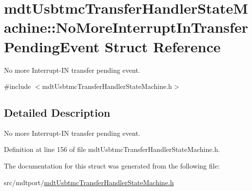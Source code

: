 \hypertarget{structmdt_usbtmc_transfer_handler_state_machine_1_1_no_more_interrupt_in_transfer_pending_event}{\section{mdt\-Usbtmc\-Transfer\-Handler\-State\-Machine\-:\-:No\-More\-Interrupt\-In\-Transfer\-Pending\-Event Struct Reference}
\label{structmdt_usbtmc_transfer_handler_state_machine_1_1_no_more_interrupt_in_transfer_pending_event}
}


No more Interrupt-\/\-I\-N transfer pending event.  




{\ttfamily \#include $<$mdt\-Usbtmc\-Transfer\-Handler\-State\-Machine.\-h$>$}



\subsection{Detailed Description}
No more Interrupt-\/\-I\-N transfer pending event. 

Definition at line 156 of file mdt\-Usbtmc\-Transfer\-Handler\-State\-Machine.\-h.



The documentation for this struct was generated from the following file\-:\begin{DoxyCompactItemize}
\item 
src/mdtport/\hyperlink{mdt_usbtmc_transfer_handler_state_machine_8h}{mdt\-Usbtmc\-Transfer\-Handler\-State\-Machine.\-h}\end{DoxyCompactItemize}
